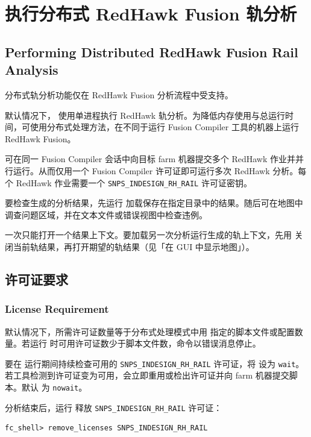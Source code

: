 \section{执行分布式 RedHawk Fusion 轨分析}
\subsection*{Performing Distributed RedHawk Fusion Rail Analysis}

\begin{noteBox}
分布式轨分析功能仅在 RedHawk Fusion 分析流程中受支持。
\end{noteBox}

默认情况下， 使用单进程执行 RedHawk 轨分析。为降低内存使用与总运行时间，可使用分布式处理方法，在不同于运行 Fusion Compiler 工具的机器上运行 RedHawk Fusion。

可在同一 Fusion Compiler 会话中向目标 farm 机器提交多个 RedHawk 作业并并行运行。从而仅用一个 Fusion Compiler 许可证即可运行多次 RedHawk 分析。每个 RedHawk 作业需要一个 \texttt{SNPS\_INDESIGN\_RH\_RAIL} 许可证密钥。

要检查生成的分析结果，先运行  加载保存在指定目录中的结果。随后可在地图中调查问题区域，并在文本文件或错误视图中检查违例。

一次只能打开一个结果上下文。要加载另一次分析运行生成的轨上下文，先用  关闭当前轨结果，再打开期望的轨结果（见「在 GUI 中显示地图」）。

\subsection{许可证要求}
\subsubsection*{License Requirement}

默认情况下，所需许可证数量等于分布式处理模式中用  指定的脚本文件或配置数量。若运行  时可用许可证数少于脚本文件数，命令以错误消息停止。

要在  运行期间持续检查可用的 \texttt{SNPS\_INDESIGN\_RH\_RAIL} 许可证，将  设为 \texttt{wait}。若工具检测到许可证变为可用，会立即重用或检出许可证并向 farm 机器提交脚本。默认  为 \texttt{nowait}。

分析结束后，运行  释放 \texttt{SNPS\_INDESIGN\_RH\_RAIL} 许可证：
\begin{lstlisting}
fc_shell> remove_licenses SNPS_INDESIGN_RH_RAIL
\end{lstlisting}

